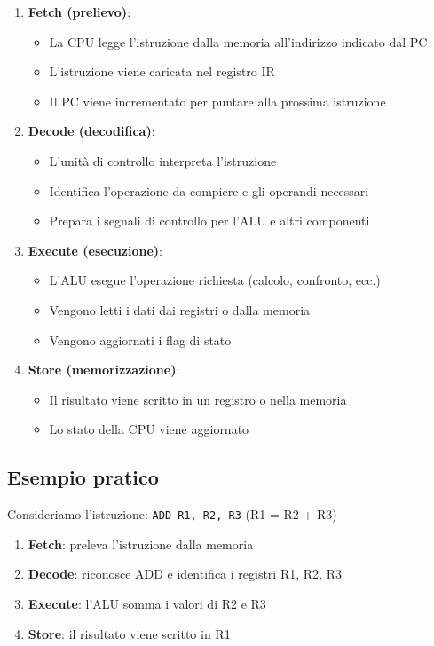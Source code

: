 \documentclass[12pt,a4paper]{article}
\begin{document}
\begin{enumerate}
    \item \textbf{Fetch (prelievo)}: 
    \begin{itemize}
        \item La CPU legge l'istruzione dalla memoria all'indirizzo indicato dal PC
        \item L'istruzione viene caricata nel registro IR
        \item Il PC viene incrementato per puntare alla prossima istruzione
    \end{itemize}
    
    \item \textbf{Decode (decodifica)}: 
    \begin{itemize}
        \item L'unità di controllo interpreta l'istruzione
        \item Identifica l'operazione da compiere e gli operandi necessari
        \item Prepara i segnali di controllo per l'ALU e altri componenti
    \end{itemize}
    
    \item \textbf{Execute (esecuzione)}: 
    \begin{itemize}
        \item L'ALU esegue l'operazione richiesta (calcolo, confronto, ecc.)
        \item Vengono letti i dati dai registri o dalla memoria
        \item Vengono aggiornati i flag di stato
    \end{itemize}
    
    \item \textbf{Store (memorizzazione)}: 
    \begin{itemize}
        \item Il risultato viene scritto in un registro o nella memoria
        \item Lo stato della CPU viene aggiornato
    \end{itemize}
\end{enumerate}

\subsection{Esempio pratico}
Consideriamo l'istruzione: \texttt{ADD R1, R2, R3} (R1 = R2 + R3)

\begin{enumerate}
    \item \textbf{Fetch}: preleva l'istruzione dalla memoria
    \item \textbf{Decode}: riconosce ADD e identifica i registri R1, R2, R3
    \item \textbf{Execute}: l'ALU somma i valori di R2 e R3
    \item \textbf{Store}: il risultato viene scritto in R1
\end{enumerate}
\end{document}
